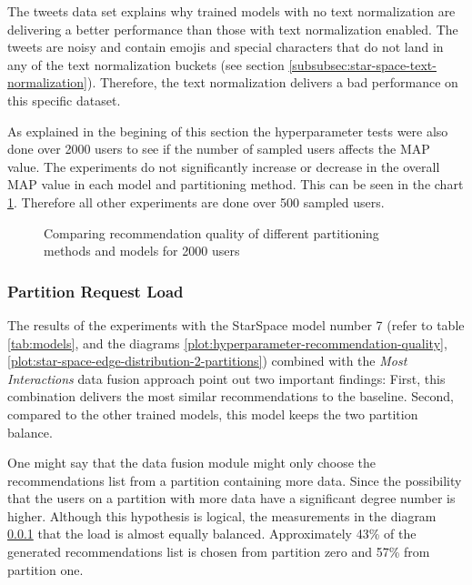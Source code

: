 The tweets data set explains why trained models with no text normalization are delivering a better performance than those with text normalization enabled. The tweets are noisy and contain emojis and special characters that do not land in any of the text normalization buckets (see section \ref{subsubsec:star-space-text-normalization}). Therefore, the text normalization delivers a bad performance on this specific dataset.


As explained in the begining of this section the hyperparameter tests were also done over 2000 users to see if the number of sampled users affects the MAP value. The experiments do not significantly increase or decrease in the overall MAP value in each model and partitioning method. This can be seen in the chart \ref{plot:hyperparameter-recommendation-quality-2000-users}. Therefore all other experiments are done over 500 sampled users.

\begin{figure}[!htb]
    \centering
    
    \caption{Comparing recommendation quality of different partitioning methods and models for 2000 users}
    \label{plot:hyperparameter-recommendation-quality-2000-users}
\end{figure}


\subsubsection{Partition Request Load}
\label{subsubsec:partition-request-load}
The results of the experiments with the StarSpace model number 7 (refer to table \ref{tab:models}, and the diagrams \ref{plot:hyperparameter-recommendation-quality}, \ref{plot:star-space-edge-distribution-2-partitions}) combined with the \emph{Most Interactions} data fusion approach point out two important findings: First, this combination delivers the most similar recommendations to the baseline. Second, compared to the other trained models, this model keeps the two partition balance.


One might say that the data fusion module might only choose the recommendations list from a partition containing more data. Since the possibility that the users on a partition with more data have a significant degree number is higher. Although this hypothesis is logical, the measurements in the diagram \ref{subsubsec:partition-request-load} that the load is almost equally balanced. Approximately 43\% of the generated recommendations list is chosen from partition zero and 57\% from partition one.

